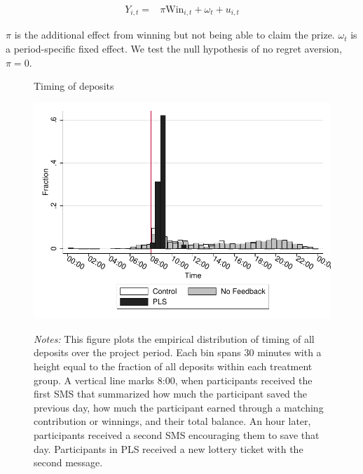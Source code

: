 \documentclass[11pt]{article}
\begin{document}
		\begin{equation} \begin{split}
		Y_{i,t} = & \pi \text{Win}_{i,t} + \omega_{t} + u_{i,t}
		\end{split} \label{eq:regret} \end{equation}

		$\pi$ is the additional effect from winning but not being able to claim the prize. $\omega_{t}$ is a period-specific fixed effect. We test the null hypothesis of no regret aversion, $\pi = 0$.


		\begin{figure}[ht]
		\centering
		\caption{Timing of deposits}
		\includegraphics[width=\textwidth]{../../figures/hist-deposits.pdf}
		\label{fig:hist-deposits}
		\caption*{\footnotesize \emph{Notes:} This figure plots the empirical distribution of timing of all deposits over the project period. Each bin spans 30 minutes with a height equal to the fraction of all deposits within each treatment group. A vertical line marks 8:00, when participants received the first SMS that summarized how much the participant saved the previous day, how much the participant earned through a matching contribution or winnings, and their total balance. An hour later, participants received a second SMS encouraging them to save that day. Participants in PLS received a new lottery ticket with the second message.}
		\end{figure}
\end{document}
